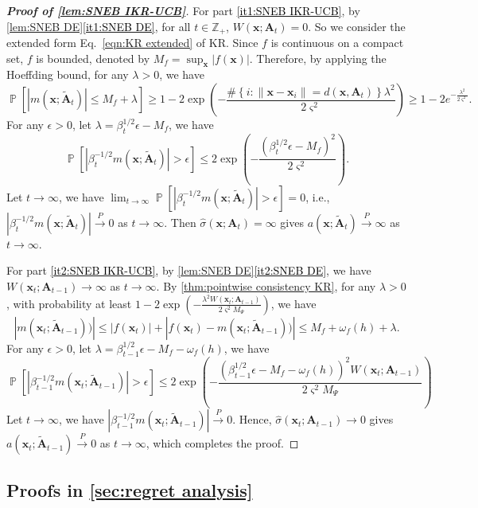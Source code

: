 \documentclass[11pt,en]{elegantpaper}
\newcommand{\x}{\bm{x}}
\newcommand{\A}{\bm{A}}
\newcommand{\1}{\mathds{1}}
\newcommand{\pto}{\overset{P}{\longrightarrow}}
\newcommand{\set}[1]{\left\{#1\right\}}
\DeclareMathOperator*{\Prob}{\mathbb{P}}
\newcommand{\itref}[1]{\hyperref[#1]{\textcolor{black}{\ref*{#1}}}}
\begin{document}
\begin{proof}[\rm\bfseries Proof of \cref{lem:SNEB IKR-UCB}]
    For part \itref{it1:SNEB IKR-UCB}, by \cref{lem:SNEB DE}\itref{it1:SNEB DE}, for all $t \in \mathbb{Z}_+$, $W(\x; \A_t) = 0$.
    So we consider the extended form Eq.~\eqref{eqn:KR extended} of KR. Since $f$ is continuous on a compact set, $f$ is bounded, denoted by $M_f = \sup_{\x} |f(\x)|$. Therefore, by applying the Hoeffding bound, for any $\lambda > 0$, we have
    \[
        \Prob\left[ |m(\x; \tilde{\A}_t)| \le M_f + \lambda \right]
        \ge 1 - 2 \exp\left( - \frac{\#\set{i : \|\x - \x_i\| = d(\x, \A_t)} \lambda^2}{2 \varsigma^2} \right)
        \ge 1 - 2 e^{-\frac{\lambda^2}{2 \varsigma^2}}.
    \]
    For any $\epsilon > 0$, let $\lambda = \beta_t^{1/2} \epsilon - M_f$, we have
    \[
        \Prob\left[ |\beta_t^{-1/2} m(\x; \tilde{\A}_t)| > \epsilon \right]
        \le 2 \exp\left( -\frac{(\beta_t^{1/2} \epsilon - M_f)^2}{2 \varsigma^2} \right).
    \]
    Let $t \to \infty$, we have $\lim_{t \to \infty} \Prob\left[ |\beta_t^{-1/2} m(\x; \tilde{\A}_t)| > \epsilon \right] = 0$, i.e., $|\beta_t^{-1/2} m(\x; \tilde{\A}_t)| \pto 0$ as $t \to \infty$. Then $\widehat{\sigma}(\x; \A_t) = \infty$ gives $a(\x; \tilde{\A}_t) \pto \infty$ as $t \to \infty$.

    For part \itref{it2:SNEB IKR-UCB}, by \cref{lem:SNEB DE}\itref{it2:SNEB DE}, we have $W(\x_t; \A_{t-1}) \to \infty$ as $t \to \infty$.
    By \cref{thm:pointwise consistency KR}, for any $\lambda > 0$,  with probability at least $1 - 2 \exp\left( -\frac{\lambda^2 W(\x_t; \A_{t-1})}{2 \varsigma^2 M_{\Psi}} \right)$, we have
    \[
        |m(\x_t; \tilde{\A}_{t-1}))|
        \le |f(\x_t)| + |f(\x_t) - m(\x_t; \tilde{\A}_{t-1}))|
        \le M_f + \omega_f(h) + \lambda.
    \]
    For any $\epsilon > 0$, let $\lambda = \beta_{t-1}^{1/2} \epsilon - M_f - \omega_f(h)$, we have
    \[
        \Prob\left[ |\beta_{t-1}^{-1/2} m(\x_t; \tilde{\A}_{t-1})| > \epsilon \right]
        \le 2 \exp\left( -\frac{(\beta_{t-1}^{1/2} \epsilon - M_f - \omega_f(h))^2 W(\x_t; \A_{t-1})}{2 \varsigma^2 M_{\Psi}} \right)
    \]
    Let $t \to \infty$, we have $|\beta_{t-1}^{-1/2} m(\x_t; \tilde{\A}_{t-1})| \pto 0$. Hence, $\widehat{\sigma}(\x_t; \A_{t-1}) \to 0$ gives $a(\x_t; \tilde{\A}_{t-1}) \pto 0$ as $t \to \infty$, which completes the proof.
\end{proof}




\subsection{Proofs in \texorpdfstring{\cref{sec:regret analysis}}{Section 4.3}}
\label{sec:proofs of regret analysis}
\end{document}
